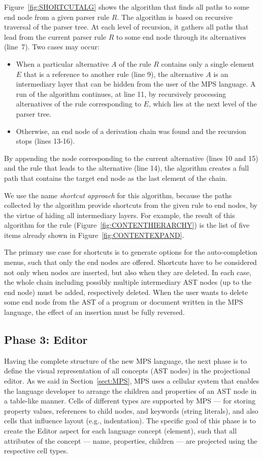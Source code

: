 Figure~\ref{fig:SHORTCUTALG} shows the algorithm that finds all paths to some end node from a given parser rule $R$.
The algorithm is based on recursive traversal of the parser tree.
At each level of recursion, it gathers all paths that lead from the current parser rule $R$ to some end node through its alternatives (line~7).
Two cases may occur:
\begin{itemize}
	\item When a particular alternative $A$ of the rule $R$ contains only a single element $E$ that is a reference to another rule (line 9), the alternative $A$ is an intermediary layer that can be hidden from the user of the MPS language.
		  A run of the algorithm continues, at line 11, by recursively processing alternatives of the rule corresponding to $E$, which lies at the next level of the parser tree.
	\item Otherwise, an end node of a derivation chain was found and the recursion stops (lines 13-16).
\end{itemize}
By appending the node corresponding to the current alternative (lines 10 and 15) and the rule that leads to the alternative (line 14), the algorithm creates a full path that contains the target end node as the last element of the chain.

We use the name \emph{shortcut approach} for this algorithm, because the paths collected by the algorithm provide shortcuts from the given rule to end nodes, by the virtue of hiding all intermediary layers.
For example, the result of this algorithm for the  rule (Figure~\ref{fig:CONTENTHIERARCHY}) is the list of five items already shown in Figure~\ref{fig:CONTENTEXPAND}.

The primary use case for shortcuts is to generate options for the auto-completion menus, such that only the end nodes are offered.
Shortcuts have to be considered not only when nodes are inserted, but also when they are deleted.
In each case, the whole chain including possibly multiple intermediary AST nodes (up to the end node) must be added, respectively deleted.
When the user wants to delete some end node from the AST of a program or document written in the MPS language, the effect of an insertion must be fully reversed.

\subsection{Phase 3: Editor}
\label{sect:EDITORDEF}

Having the complete structure of the new MPS language, the next phase is to define the visual representation of all concepts (AST nodes) in the projectional editor.
As we said in Section~\ref{sect:MPS}, MPS uses a cellular system that enables the language developer to arrange the children and properties of an AST node in a table-like manner.
Cells of different types are supported by MPS --- for storing property values, references to child nodes, and keywords (string literals), and also cells that influence layout (e.g., indentation).
The specific goal of this phase is to create the Editor aspect for each language concept (element), such that all attributes of the concept --- name, properties, children --- are projected using the respective cell types.

